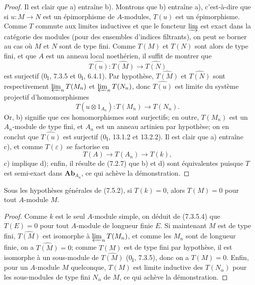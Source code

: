 \begin{proof}
Il est clair que a) entraîne b). Montrons que b) entraîne a), c'est-à-dire que
si $u:M\to N$ est un épimorphisme de $A$-modules, $T(u)$ est un épimorphisme.
Comme $T$ commute aux limites inductives et que le foncteur $\varinjlim$ est
exact dans la catégorie des modules (pour des ensembles d'indices filtrants),
on peut se borner au cas où $M$ et $N$ sont de type fini. Comme $T(M)$ et
$T(N)$ sont alors de type fini, et que $A$ est un anneau local noethérien, il
suffit de montrer que
\[
  \widehat{T(u)}:
  \widehat{T(M)}
  \longrightarrow
  \widehat{T(N)}
\]
est surjectif ($0_{\mathrm I}$, 7.3.5 et $0_{\mathrm I}$, 6.4.1). Par hypothèse,
$\widehat{T(M)}$ et $\widehat{T(N)}$ sont respectivement $\varprojlim_n T(M_n)$
et $\varprojlim_n T(N_n)$, donc $\widehat{T(u)}$ est limite du système projectif
d'homomorphismes
\[
  T(u\otimes1_{A_n}):T(M_n)\longrightarrow T(N_n).
\]
Or, b) signifie que ces homomorphismes sont surjectifs; en outre, $T(M_n)$ est
un $A_n$-module de type fini, et $A_n$ est un anneau artinien par hypothèse; on
en conclut que $\widehat{T(u)}$ est surjectif ($0_{\mathrm I}$, 13.1.2 et
13.2.2). Il est clair que a) entraîne c), et comme $T(\varepsilon)$ se factorise
en
\[
  T(A)\longrightarrow T(A_n)\longrightarrow T(k),
\]
c) implique d); enfin, il résulte de (7.2.7) que b) et d) sont équivalentes
puisque $T$ est semi-exact dans $\mathbf{Ab}_{A_n}$, ce qui achève la
démonstration.
\end{proof}

\begin{corollary}[7.5.3]
Sous les hypothèses générales de (7.5.2), si $T(k)=0$, alors $T(M)=0$ pour tout
$A$-module $M$.
\end{corollary}

\begin{proof}
Comme $k$ est le seul $A$-module simple, on déduit de (7.3.5.4) que $T(E)=0$
pour tout $A$-module de longueur finie $E$. Si maintenant $M$ est de type fini,
$\widehat{T(M)}$ est isomorphe à $\varprojlim_n T(M_n)$, et comme les $M_n$ sont
de longueur finie, on a $\widehat{T(M)}=0$; comme $T(M)$ est de type fini par
hypothèse, il est isomorphe à un sous-module de $\widehat{T(M)}$
($0_{\mathrm I}$, 7.3.5), donc on a $T(M)=0$. Enfin, pour un $A$-module $M$
quelconque, $T(M)$ est limite inductive des $T(N_\alpha)$ pour les sous-modules
de type fini $N_\alpha$ de $M$, ce qui achève la démonstration.
\end{proof}

